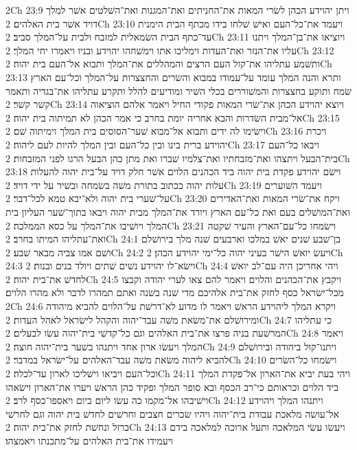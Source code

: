 2Ch 23:9  ויתן יהוידע הכהן לשׂרי המאות את־החניתים ואת־המגנות ואת־השׁלטים אשׁר למלך דויד אשׁר בית האלהים׃
2Ch 23:10  ויעמד את־כל־העם ואישׁ שׁלחו בידו מכתף הבית הימנית עד־כתף הבית השׂמאלית למזבח ולבית על־המלך סביב׃
2Ch 23:11  ויוציאו את־בן־המלך ויתנו עליו את־הנזר ואת־העדות וימליכו אתו וימשׁחהו יהוידע ובניו ויאמרו יחי המלך׃
2Ch 23:12  ותשׁמע עתליהו את־קול העם הרצים והמהללים את־המלך ותבוא אל־העם בית יהוה׃
2Ch 23:13  ותרא והנה המלך עומד על־עמודו במבוא והשׂרים והחצצרות על־המלך וכל־עם הארץ שׂמח ותוקע בחצצרות והמשׁוררים בכלי השׁיר ומודיעים להלל ותקרע עתליהו את־בגדיה ותאמר קשׁר קשׁר׃
2Ch 23:14  ויוצא יהוידע הכהן את־שׂרי המאות פקודי החיל ויאמר אלהם הוציאוה אל־מבית השׂדרות והבא אחריה יומת בחרב כי אמר הכהן לא תמיתוה בית יהוה׃
2Ch 23:15  וישׂימו לה ידים ותבוא אל־מבוא שׁער־הסוסים בית המלך וימיתוה שׁם׃
2Ch 23:16  ויכרת יהוידע ברית בינו ובין כל־העם ובין המלך להיות לעם ליהוה׃
2Ch 23:17  ויבאו כל־העם בית־הבעל ויתצהו ואת־מזבחתיו ואת־צלמיו שׁברו ואת מתן כהן הבעל הרגו לפני המזבחות׃
2Ch 23:18  וישׂם יהוידע פקדת בית יהוה ביד הכהנים הלוים אשׁר חלק דויד על־בית יהוה להעלות עלות יהוה ככתוב בתורת משׁה בשׂמחה ובשׁיר על ידי דויד׃
2Ch 23:19  ויעמד השׁוערים על־שׁערי בית יהוה ולא־יבא טמא לכל־דבר׃
2Ch 23:20  ויקח את־שׂרי המאות ואת־האדירים ואת־המושׁלים בעם ואת כל־עם הארץ ויורד את־המלך מבית יהוה ויבאו בתוך־שׁער העליון בית המלך ויושׁיבו את־המלך על כסא הממלכה׃
2Ch 23:21  וישׂמחו כל־עם־הארץ והעיר שׁקטה ואת־עתליהו המיתו בחרב׃
2Ch 24:1  בן־שׁבע שׁנים יאשׁ במלכו וארבעים שׁנה מלך בירושׁלם ושׁם אמו צביה מבאר שׁבע׃
2Ch 24:2  ויעשׂ יואשׁ הישׁר בעיני יהוה כל־ימי יהוידע הכהן׃
2Ch 24:3  וישׂא־לו יהוידע נשׁים שׁתים ויולד בנים ובנות׃
2Ch 24:4  ויהי אחריכן היה עם־לב יואשׁ לחדשׁ את־בית יהוה׃
2Ch 24:5  ויקבץ את־הכהנים והלוים ויאמר להם צאו לערי יהודה וקבצו מכל־ישׂראל כסף לחזק את־בית אלהיכם מדי שׁנה בשׁנה ואתם תמהרו לדבר ולא מהרו הלוים׃
2Ch 24:6  ויקרא המלך ליהוידע הראשׁ ויאמר לו מדוע לא־דרשׁת על־הלוים להביא מיהודה ומירושׁלם את־משׂאת משׁה עבד־יהוה והקהל לישׂראל לאהל העדות׃
2Ch 24:7  כי עתליהו המרשׁעת בניה פרצו את־בית האלהים וגם כל־קדשׁי בית־יהוה עשׂו לבעלים׃
2Ch 24:8  ויאמר המלך ויעשׂו ארון אחד ויתנהו בשׁער בית־יהוה חוצה׃
2Ch 24:9  ויתנו־קול ביהודה ובירושׁלם להביא ליהוה משׂאת משׁה עבד־האלהים על־ישׂראל במדבר׃
2Ch 24:10  וישׂמחו כל־השׂרים וכל־העם ויביאו וישׁליכו לארון עד־לכלה׃
2Ch 24:11  ויהי בעת יביא את־הארון אל־פקדת המלך ביד הלוים וכראותם כי־רב הכסף ובא סופר המלך ופקיד כהן הראשׁ ויערו את־הארון וישׂאהו וישׁיבהו אל־מקמו כה עשׂו ליום ביום ויאספו־כסף לרב׃
2Ch 24:12  ויתנהו המלך ויהוידע אל־עושׂה מלאכת עבודת בית־יהוה ויהיו שׂכרים חצבים וחרשׁים לחדשׁ בית יהוה וגם לחרשׁי ברזל ונחשׁת לחזק את־בית יהוה׃
2Ch 24:13  ויעשׂו עשׂי המלאכה ותעל ארוכה למלאכה בידם ויעמידו את־בית האלהים על־מתכנתו ויאמצהו׃
